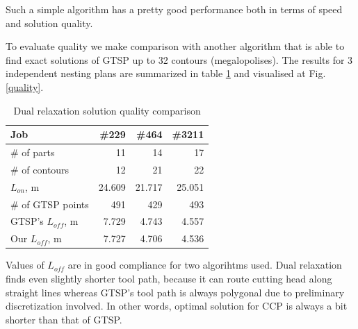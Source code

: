 \documentclass{../download/tPRS2e}
\begin{document}
Such a simple algorithm has a pretty good performance
both in terms of speed and solution quality.

To evaluate quality
we make comparison with another algorithm
that is able to find exact solutions of GTSP
up to 32 contours (megalopolises).
The results for 3 independent 
nesting plans
are summarized in table \ref{exact-3}
and visualised at Fig. \ref{quality}.

\begin{table}[h]
    \begin{center}    
    \begin{tabular}{l|*{3}{r}}
        Job & \#229 & \#464 & \#3211 \\
        \hline
        \# of parts & 11 & 14 & 17\\
        \# of contours & 12 & 21 & 22 \\
        $L_{on}$, m & 24.609 & 21.717 & 25.051 \\
        \# of GTSP points & 491 & 429 & 493 \\
        GTSP's $L_{off}$, m & 7.729 & 4.743 & 4.557 \\
        Our $L_{off}$, m & 7.727 & 4.706 & 4.536 \\
    \end{tabular}
    \caption{Dual relaxation solution quality comparison}
    \label{exact-3}
    \end{center}
    \end{table}

Values of $L_{off}$ are in good compliance for two algorihtms used.
Dual relaxation finds even slightly shorter tool path,
because it can route cutting head along straight lines
whereas GTSP's tool path is always polygonal
due to preliminary discretization involved.
In other words,
optimal solution for CCP is always a bit shorter
than that of GTSP.
\end{document}
